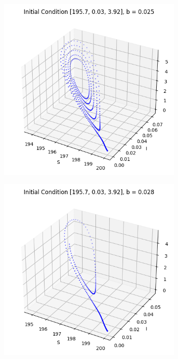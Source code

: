 \begin{itemize}
\begin{figure}[H]
\begin{subfigure}[b]{0.3\textwidth}
    \centering
    \includegraphics[width=\textwidth]{images/task5/ex4_t5_2_b_16.png}
    \label{fig:subfig_b16}
\end{subfigure}
\begin{subfigure}[b]{0.3\textwidth}
    \centering
    \includegraphics[width=\textwidth]{images/task5/ex4_t5_2_b_19.png}

\end{subfigure}
\end{figure}
\end{itemize}
